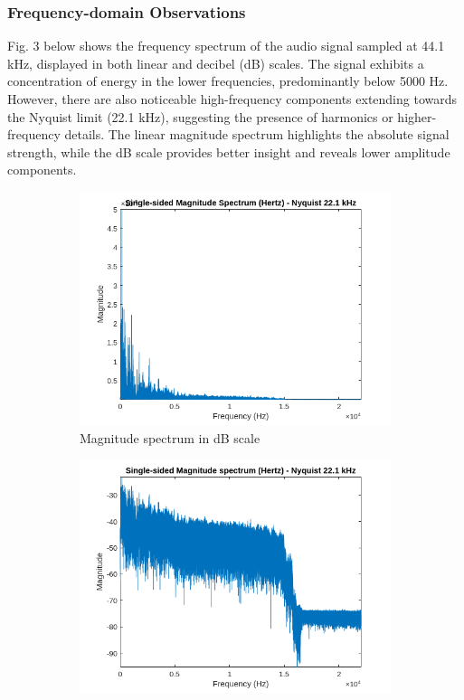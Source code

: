 \documentclass[12pt]{article}
\begin{document}
\subsubsection{Frequency-domain Observations}
Fig. 3 below shows the frequency spectrum of the audio signal sampled at 44.1 kHz, displayed in both linear and decibel (dB) scales. The signal exhibits a concentration of energy in the lower frequencies, predominantly below 5000 Hz. However, there are also noticeable high-frequency components extending towards the Nyquist limit (22.1 kHz), suggesting the presence of harmonics or higher-frequency details. The linear magnitude spectrum highlights the absolute signal strength, while the dB scale provides better insight and reveals lower amplitude components.

\FloatBarrier
\begin{figure}[htbp]
  \centering
  \begin{subfigure}[b]{0.48\textwidth} %
    \includegraphics[width=\linewidth]{labs/lab1/lab-report-tex/figures/figure_5.png}
    \caption{Magnitude spectrum in dB scale}
    \label{fig:f2}
  \end{subfigure}
  \begin{subfigure}[b]{0.48\textwidth} %
    \includegraphics[width=\linewidth]{labs/lab1/lab-report-tex/figures/figure_6.png}

\end{subfigure}
\end{figure}
\end{document}
